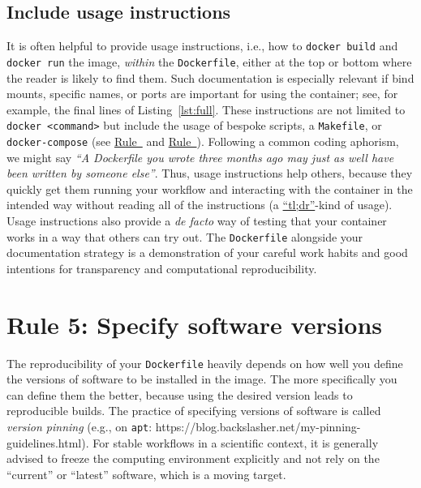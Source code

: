 \documentclass[10pt,letterpaper]{article}
\begin{document}
\normalsize

\hypertarget{include-usage-instructions}{%
\subsection{Include usage
instructions}\label{include-usage-instructions}}

It is often helpful to provide usage instructions, i.e., how to
\texttt{docker\ build} and \texttt{docker\ run} the image, \emph{within}
the \texttt{Dockerfile}, either at the top or bottom where the reader is
likely to find them. Such documentation is especially relevant if bind
mounts, specific names, or ports are important for using the container;
see, for example, the final lines of Listing~\ref{lst:full}. These
instructions are not limited to
\texttt{docker\ \textless{}command\textgreater{}} but include the usage
of bespoke scripts, a \texttt{Makefile}, or \texttt{docker-compose} (see
\hyperref[{rule:interactive}]{Rule~} and
\hyperref[{rule:usage}]{Rule~}). Following a
common coding aphorism, we might say \emph{``A Dockerfile you wrote
three months ago may just as well have been written by someone else''}.
Thus, usage instructions help others, because they quickly get them
running your workflow and interacting with the container in the intended
way without reading all of the instructions (a
\href{https://en.wikipedia.org/wiki/Wikipedia:Too_long;_didn\%27t_read}{``tl;dr''}-kind
of usage). Usage instructions also provide a \emph{de facto} way of
testing that your container works in a way that others can try out. The
\texttt{Dockerfile} alongside your documentation strategy is a
demonstration of your careful work habits and good intentions for
transparency and computational reproducibility.

\hypertarget{rule-5-specify-software-versions}{%
\section*{Rule 5: Specify software
versions}\label{rule-5-specify-software-versions}}

  \label{rule:pinning} 

The reproducibility of your \texttt{Dockerfile} heavily depends on how
well you define the versions of software to be installed in the image.
The more specifically you can define them the better, because using the
desired version leads to reproducible builds. The practice of specifying
versions of software is called \emph{version pinning} (e.g., on
\texttt{apt}: https://blog.backslasher.net/my-pinning-guidelines.html).
For stable workflows in a scientific context, it is generally advised to
freeze the computing environment explicitly and not rely on the
``current'' or ``latest'' software, which is a moving target.
\end{document}
